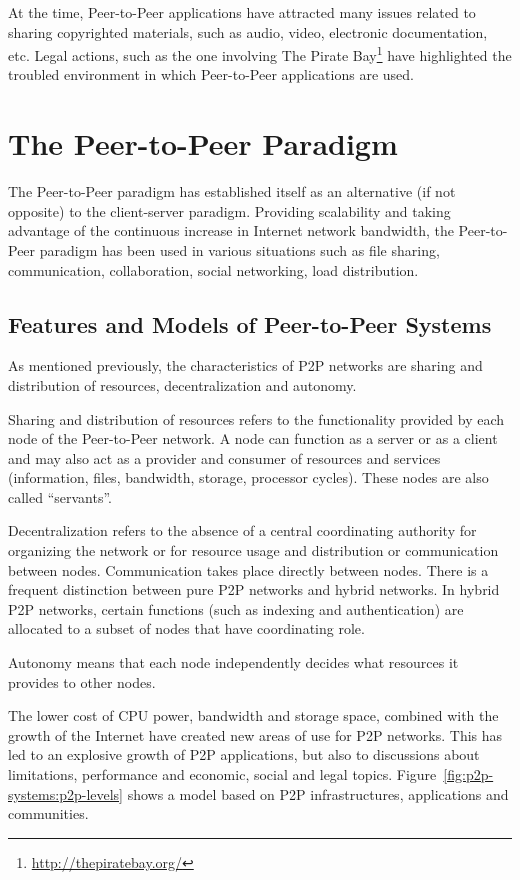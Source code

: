 At the time, Peer-to-Peer applications have attracted many issues related to
sharing copyrighted materials, such as audio, video, electronic documentation,
etc. Legal actions, such as the one involving The Pirate
Bay\footnote{\url{http://thepiratebay.org/}} have highlighted the troubled
environment in which Peer-to-Peer applications are used.

\section{The Peer-to-Peer Paradigm}
\label{sec:p2p-systems:paragigm}

The Peer-to-Peer paradigm has established itself as an alternative (if not
opposite) to the client-server paradigm. Providing scalability and taking
advantage of the continuous increase in Internet network bandwidth, the
Peer-to-Peer paradigm has been used in various situations such as file
sharing, communication, collaboration, social networking, load distribution.

\subsection{Features and Models of Peer-to-Peer Systems}

As mentioned previously, the characteristics of P2P networks are sharing and
distribution of resources, decentralization and autonomy.

Sharing and distribution of resources refers to the functionality provided by
each node of the Peer-to-Peer network. A node can function as a server or as a
client and may also act as a provider and consumer of resources and
services (information, files, bandwidth, storage, processor cycles). These
nodes are also called ``servants''.

Decentralization refers to the absence of a central coordinating authority for
organizing the network or for resource usage and distribution or communication
between nodes. Communication takes place directly between nodes. There is a
frequent distinction between pure P2P networks and hybrid networks. In
hybrid P2P networks, certain functions (such as indexing and authentication)
are allocated to a subset of nodes that have coordinating role.

Autonomy means that each node independently decides what resources it provides
to other nodes.

The lower cost of CPU power, bandwidth and storage space, combined with
the growth of the Internet have created new areas of use for P2P networks.
This has led to an explosive growth of P2P applications, but also to
discussions about limitations, performance and economic, social and legal
topics.  Figure~\ref{fig:p2p-systems:p2p-levels} shows a model based on P2P
infrastructures, applications and communities.

